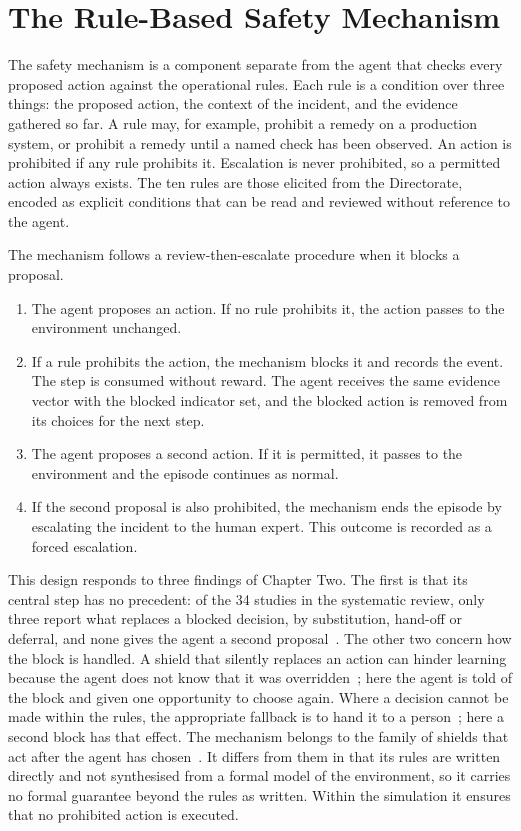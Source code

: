 \section{The Rule-Based Safety Mechanism}
\label{sec:mechanism}

The safety mechanism is a component separate from the agent that checks every proposed action against the operational rules. Each rule is a condition over three things: the proposed action, the context of the incident, and the evidence gathered so far. A rule may, for example, prohibit a remedy on a production system, or prohibit a remedy until a named check has been observed. An action is prohibited if any rule prohibits it. Escalation is never prohibited, so a permitted action always exists. The ten rules are those elicited from the Directorate, encoded as explicit conditions that can be read and reviewed without reference to the agent.

The mechanism follows a review-then-escalate procedure when it blocks a proposal.

\begin{enumerate}
  \item The agent proposes an action. If no rule prohibits it, the action passes to the environment unchanged.
  \item If a rule prohibits the action, the mechanism blocks it and records the event. The step is consumed without reward. The agent receives the same evidence vector with the blocked indicator set, and the blocked action is removed from its choices for the next step.
  \item The agent proposes a second action. If it is permitted, it passes to the environment and the episode continues as normal.
  \item If the second proposal is also prohibited, the mechanism ends the episode by escalating the incident to the human expert. This outcome is recorded as a forced escalation.
\end{enumerate}

This design responds to three findings of Chapter Two. The first is that its central step has no precedent: of the 34 studies in the systematic review, only three report what replaces a blocked decision, by substitution, hand-off or deferral, and none gives the agent a second proposal~\cite{opol2026slr,ravi2025,singh2026,sahin2026}. The other two concern how the block is handled. A shield that silently replaces an action can hinder learning because the agent does not know that it was overridden~\cite{yang2023}; here the agent is told of the block and given one opportunity to choose again. Where a decision cannot be made within the rules, the appropriate fallback is to hand it to a person~\cite{pacella2026}; here a second block has that effect. The mechanism belongs to the family of shields that act after the agent has chosen~\cite{alshiekh2018}. It differs from them in that its rules are written directly and not synthesised from a formal model of the environment, so it carries no formal guarantee beyond the rules as written. Within the simulation it ensures that no prohibited action is executed.


